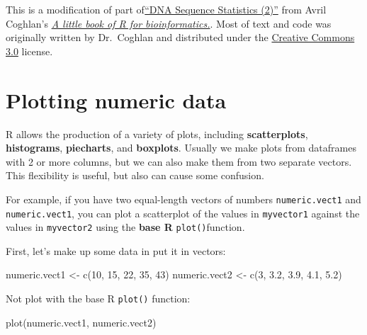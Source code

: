 \documentclass[
]{book}
\newenvironment{Shaded}{\begin{snugshade}}{\end{snugshade}}
\newcommand{\DecValTok}[1]{\textcolor[rgb]{0.00,0.00,0.81}{#1}}
\newcommand{\FloatTok}[1]{\textcolor[rgb]{0.00,0.00,0.81}{#1}}
\newcommand{\FunctionTok}[1]{\textcolor[rgb]{0.00,0.00,0.00}{#1}}
\newcommand{\NormalTok}[1]{#1}
\newcommand{\OtherTok}[1]{\textcolor[rgb]{0.56,0.35,0.01}{#1}}
\begin{document}
This is a modification of part of\href{https://a-little-book-of-r-for-bioinformatics.readthedocs.io/en/latest/src/chapter2.html}{``DNA Sequence Statistics (2)''} from Avril Coghlan's \href{https://a-little-book-of-r-for-bioinformatics.readthedocs.io/en/latest/index.html}{\emph{A little book of R for bioinformatics.}}. Most of text and code was originally written by Dr.~Coghlan and distributed under the \href{https://creativecommons.org/licenses/by/3.0/us/}{Creative Commons 3.0} license.

\hypertarget{plotting-numeric-data}{%
\section{Plotting numeric data}\label{plotting-numeric-data}}

R allows the production of a variety of plots, including \textbf{scatterplots}, \textbf{histograms}, \textbf{piecharts}, and \textbf{boxplots}. Usually we make plots from dataframes with 2 or more columns, but we can also make them from two separate vectors. This flexibility is useful, but also can cause some confusion.

For example, if you have two equal-length vectors of numbers \texttt{numeric.vect1} and \texttt{numeric.vect1}, you can plot a scatterplot of the values in \texttt{myvector1} against the values in \texttt{myvector2} using the \textbf{base R} \texttt{plot()}function.

First, let's make up some data in put it in vectors:

\begin{Shaded}
\begin{Highlighting}[]
\NormalTok{numeric.vect1 }\OtherTok{\textless{}{-}} \FunctionTok{c}\NormalTok{(}\DecValTok{10}\NormalTok{, }\DecValTok{15}\NormalTok{, }\DecValTok{22}\NormalTok{, }\DecValTok{35}\NormalTok{, }\DecValTok{43}\NormalTok{)}
\NormalTok{numeric.vect2 }\OtherTok{\textless{}{-}} \FunctionTok{c}\NormalTok{(}\DecValTok{3}\NormalTok{, }\FloatTok{3.2}\NormalTok{, }\FloatTok{3.9}\NormalTok{, }\FloatTok{4.1}\NormalTok{, }\FloatTok{5.2}\NormalTok{)}
\end{Highlighting}
\end{Shaded}

Not plot with the base R \texttt{plot()} function:

\begin{Shaded}
\begin{Highlighting}[]
\FunctionTok{plot}\NormalTok{(numeric.vect1, numeric.vect2)}
\end{Highlighting}
\end{Shaded}
\end{document}
